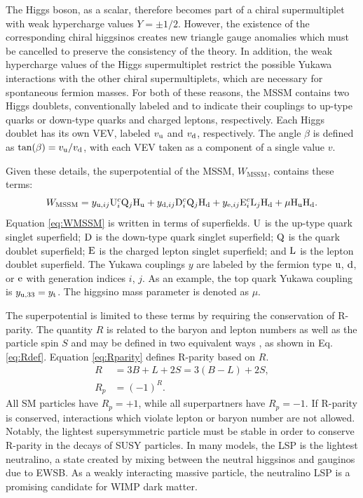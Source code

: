 \documentclass[12pt]{thesis}  %
\newcommand{\Pe}{\ensuremath{\cmsSymbolFace{e}}\xspace}
\providecommand{\PU}{\ensuremath{\cmsSymbolFace{U}}\xspace}
\providecommand{\PD}{\ensuremath{\cmsSymbolFace{D}}\xspace}
\providecommand{\PQ}{\ensuremath{\cmsSymbolFace{Q}}\xspace}
\providecommand{\PE}{\ensuremath{\cmsSymbolFace{E}}\xspace}
\providecommand{\PL}{\ensuremath{\cmsSymbolFace{L}}\xspace}
\begin{document}
The Higgs boson, as a scalar, therefore becomes part of a chiral supermultiplet with weak hypercharge values $Y = \pm 1/2$. However, the existence of the corresponding chiral higgsinos creates new triangle gauge anomalies which must be cancelled to preserve the consistency of the theory. In addition, the weak hypercharge values of the Higgs supermultiplet restrict the possible Yukawa interactions with the other chiral supermultiplets, which are necessary for spontaneous fermion masses. For both of these reasons, the MSSM contains two Higgs doublets, conventionally labeled \Hone and \Htwo to indicate their couplings to up-type quarks or down-type quarks and charged leptons, respectively. Each Higgs doublet has its own VEV, labeled $v_{\mathrm{u}}$ and $v_{\mathrm{d}}$, respectively. The angle $\beta$ is defined as $\text{tan}(\beta) = v_{\mathrm{u}}/v_{\mathrm{d}}$, with each VEV taken as a component of a single value $v$.

Given these details, the superpotential of the MSSM, $W_{\text{MSSM}}$, contains these terms:
\begin{equation}
W_{\text{MSSM}} = y_{\cPqu,ij}\PU_{i}^{c}\PQ_{j}\Hone + y_{\cPqd,ij}\PD_{i}^{c}\PQ_{j}\Htwo + y_{\Pe,ij}\PE_{i}^{c}\PL_{j}\Htwo + \mu \Hone \Htwo. \label{eq:WMSSM}
\end{equation}
Equation \eqref{eq:WMSSM} is written in terms of superfields. $\PU$ is the up-type quark singlet superfield; $\PD$ is the down-type quark singlet superfield; $\PQ$ is the quark doublet superfield; $\PE$ is the charged lepton singlet superfield; and $\PL$ is the lepton doublet superfield. The Yukawa couplings $y$ are labeled by the fermion type $\mathrm{u}$, $\mathrm{d}$, or $\Pe$ with generation indices $i$, $j$. As an example, the top quark Yukawa coupling is $y_{\mathrm{u},33} = y_{\mathrm{t}}$. The higgsino mass parameter is denoted as $\mu$.

The superpotential is limited to these terms by requiring the conservation of R-parity. The quantity $R$ is related to the baryon and lepton numbers as well as the particle spin $S$ and may be defined in two equivalent ways \cite{Barbier}, as shown in Eq. \eqref{eq:Rdef}. Equation \eqref{eq:Rparity} defines R-parity based on $R$.
\begin{align}
R &= 3B+L+2S = 3(B-L)+2S, \label{eq:Rdef} \\
R_{p} &= (-1)^{R}. \label{eq:Rparity}
\end{align}
All SM particles have $R_{p} = +1$, while all superpartners have $R_{p} = -1$. If R-parity is conserved, interactions which violate lepton or baryon number are not allowed. Notably, the lightest supersymmetric particle must be stable in order to conserve R-parity in the decays of SUSY particles. In many models, the LSP is the lightest neutralino, a state created by mixing between the neutral higgsinos and gauginos due to EWSB. As a weakly interacting massive particle, the neutralino LSP is a promising candidate for WIMP dark matter.
\end{document}
